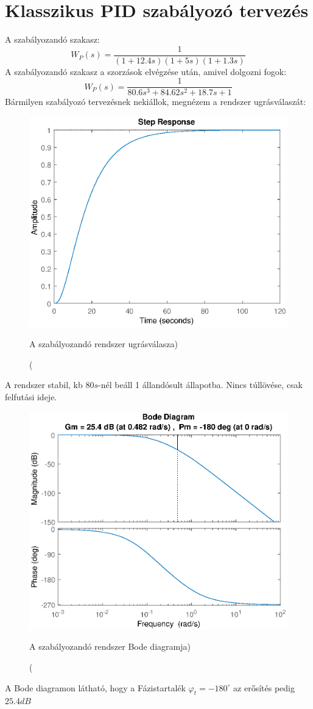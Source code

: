 \documentclass[12pt]{article}
\begin{document}
\section{Klasszikus PID szabályozó tervezés}
A szabályozandó szakasz: \[W_P(s)=\frac{1}{(1+12.4s)(1+5s)(1+1.3s)}\]
A szabályozandó szakasz a szorzások elvégzése után, amivel dolgozni fogok:
\[W_P(s)=\frac{1}{80.6s^3+84.62s^2+18.7s+1}\]
Bármilyen szabályozó tervezésnek nekiállok, megnézem a rendszer ugrásválaszát:
\begin{figure}[H]
\centering
\includegraphics[scale=.70]{WPLANTSTEPRESPONSE}
\caption(A szabályozandó rendszer ugrásválasza)
\end{figure}
A rendszer stabil, kb $80s$-nél beáll 1 állandósult állapotba. Nincs túllövése, csak felfutási ideje. 
\begin{figure}[H]
\centering
\includegraphics[scale=.70]{WPLANTMARGIN}
\caption(A szabályozandó rendszer Bode diagramja)
\end{figure}
A Bode diagramon látható, hogy a Fázistartalék $\varphi_t=-180^\circ$ az erősítés pedig $25.4dB$
\end{document}
